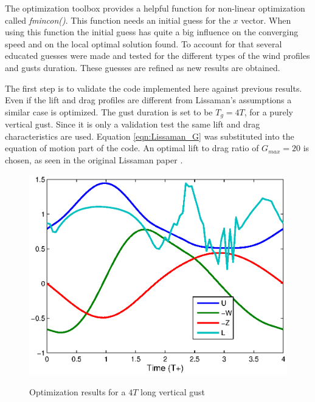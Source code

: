 \par The optimization toolbox provides a helpful function for non-linear optimization called \emph{fmincon()}.
This function needs an initial guess for the $x$ vector.
When using this function the initial guess has quite a big influence on the converging speed and on the local optimal solution found.
To account for that several educated guesses were made and tested for the different types of the wind profiles and gusts duration.
These guesses are refined as new results are obtained.


 \label{sec:results_QS}

The first step is to validate the code implemented here against previous results. 
Even if the lift and drag profiles are different from Lissaman's assumptions a similar case is optimized.
The gust duration is set to be $T_g=4 T$, for a purely vertical gust.
Since it is only a validation test the same lift and drag characteristics are used. Equation \ref{eqn:Lissaman_G} was substituted into the equation of motion part of the code. An optimal lift to drag ratio of $G_{max}=20$ is chosen, as seen in the original Lissaman paper \cite{Lissaman2007neutral}.

\begin{figure}[ht]
  \begin{center}	
    \scalebox{1.0}
    {\includegraphics{./Figures/Windtype=1_Tg=4_Wg=0p129_quad_G=20.eps}}
  \end{center}
  \caption{Optimization results for a $4T$ long vertical gust}
  \label{fig:Validation_optimization}
\end{figure}

